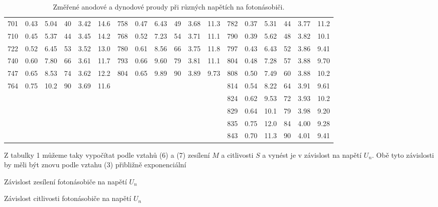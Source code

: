 \documentclass[a4paper,11pt]{article}
\begin{document}
\begin{table}[htpb]
{\begin{tabular}{ | c c c c c c | c c c c c c | c c c c c c |}
        701 & 0.43 & 5.04 & 40 & 3.42 & 14.6 & 758 & 0.47 & 6.43 & 49 & 3.68 & 11.3 & 782 & 0.37 & 5.31 & 44 & 3.77 & 11.2 \\
        710 & 0.45 & 5.37 & 44 & 3.45 & 14.2 & 768 & 0.52 & 7.23 & 54 & 3.71 & 11.1 & 790 & 0.39 & 5.62 & 48 & 3.82 & 10.1 \\
        722 & 0.52 & 6.45 & 53 & 3.52 & 13.0 & 780 & 0.61 & 8.56 & 66 & 3.75 & 11.8 & 797 & 0.43 & 6.43 & 52 & 3.86 & 9.41 \\
        740 & 0.60 & 7.80 & 66 & 3.61 & 11.7 & 793 & 0.66 & 9.60 & 79 & 3.81 & 11.1 & 804 & 0.48 & 7.28 & 57 & 3.88 & 9.70 \\
        747 & 0.65 & 8.53 & 74 & 3.62 & 12.2 & 804 & 0.65 & 9.89 & 90 & 3.89 & 9.73 & 808 & 0.50 & 7.49 & 60 & 3.88 & 10.2 \\
        764 & 0.75 & 10.2 & 90 & 3.69 & 11.6 &     &      &      &    &      &      & 814 & 0.54 & 8.22 & 64 & 3.91 & 9.61 \\
            &      &      &    &      &      &     &      &      &    &      &      & 824 & 0.62 & 9.53 & 72 & 3.93 & 10.2 \\
            &      &      &    &      &      &     &      &      &    &      &      & 829 & 0.64 & 10.1 & 79 & 3.98 & 9.20 \\
            &      &      &    &      &      &     &      &      &    &      &      & 835 & 0.75 & 12.0 & 84 & 4.00 & 9.28 \\
            &      &      &    &      &      &     &      &      &    &      &      & 843 & 0.70 & 11.3 & 90 & 4.01 & 9.41 \\
        \hline     
    \end{tabular}  
    }
    \caption{Změřené anodové a dynodové proudy při různých napětích na fotonásobiči.}
\end{table}        

Z tabulky 1 můžeme taky vypočítat podle vztahů (6) a (7) zesílení $ M $ a citlivosti $ S $ a vynést je v závislost na napětí $ U_n $. Obě tyto závislosti by měli být znovu podle vztahu (3) přibližně exponenciální 
                   
\begin{table}[htpb]
    \begin{minipage}[b]{.45\linewidth}
        \centering
        
        \captionsetup{type=graph}
        \caption{Závislost zesílení fotonásobiče na napětí $ U_n $}
    \end{minipage} 
    \hfill
    \begin{minipage}[b]{.45\linewidth}
        \centering
        
        \captionsetup{type=graph}
        \caption{Závislost citlivosti fotonásobiče na napětí $ U_n $ }
    \end{minipage} 
\end{table}
\end{document}
